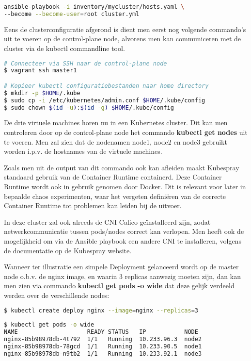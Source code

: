 \begin{lstlisting}[language=bash]
ansible-playbook -i inventory/mycluster/hosts.yaml \
--become --become-user=root cluster.yml

\end{lstlisting}

Eens de clusterconfiguratie afgerond is dient men eerst nog volgende commando's uit te voeren op de control-plane node, alvorens men kan communiceren met de cluster via de kubectl commandline tool. 
\begin{lstlisting}[language=bash] 
# Connecteer via SSH naar de control-plane node    
$ vagrant ssh master1

# Kopieer kubectl configuratiebestanden naar home directory
$ mkdir -p $HOME/.kube
$ sudo cp -i /etc/kubernetes/admin.conf $HOME/.kube/config
$ sudo chown $(id -u):$(id -g) $HOME/.kube/config

\end{lstlisting}

De drie virtuele machines horen nu in een Kubernetes cluster. Dit kan men controleren door op de control-plane node het commando {\bf kubectl get nodes} uit te voeren. 
Men zal zien dat de nodenamen node1, node2 en node3 gebruikt worden i.p.v. de hostnames van de virtuele machines.

Zoals men uit de output van dit commando ook kan afleiden maakt Kubespray standaard gebruik van de Container Runtime containerd. Deze Container Runtime wordt ook in gebruik genomen door Docker. Dit is relevant voor later in bepaalde chaos experimenten, waar het vergeten definiëren van de correcte Container Runtime tot problemen kan leiden bij de uitvoer. 

In deze cluster zal ook alreeds de CNI Calico geïnstalleerd zijn, zodat netwerkcommunicatie tussen pods/nodes correct kan verlopen. Men heeft ook de mogelijkheid om via de Ansible playbook een andere CNI te installeren, volgens de documentatie op de Kubespray website. 

Wanneer ter illustratie een simpele Deployment gelanceerd wordt op de master node o.b.v. de nginx image, en waarin 3 replicas aanwezig moeten zijn, dan kan men zien via commando {\bf kubectl get pods -o wide} dat deze gelijk verdeeld werden over de verschillende nodes:

\begin{lstlisting}[language=bash]
$ kubectl create deploy nginx --image=nginx --replicas=3
        
$ kubectl get pods -o wide
NAME                    READY STATUS   IP           NODE
nginx-85b98978db-4t792  1/1   Running  10.233.96.3  node2
nginx-85b98978db-78gcd  1/1   Running  10.233.90.5  node1
nginx-85b98978db-n9tb2  1/1   Running  10.233.92.1  node3

\end{lstlisting}

